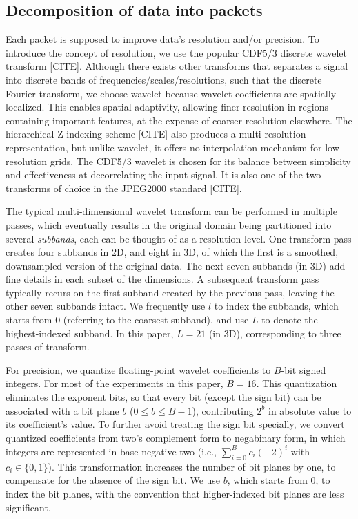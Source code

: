 \subsection{Decomposition of data into packets}\label{sec:data-streaming-framework}
Each packet is supposed to improve data's resolution and/or precision. To introduce the concept of
resolution, we use the popular CDF5/3 discrete wavelet transform [CITE]. Although there exists other
transforms that separates a signal into discrete bands of frequencies/scales/resolutions, such that
the discrete Fourier transform, we choose wavelet because wavelet coefficients are spatially
localized. This enables spatial adaptivity, allowing finer resolution in regions containing
important features, at the expense of coarser resolution elsewhere. The hierarchical-Z indexing
scheme [CITE] also produces a multi-resolution representation, but unlike wavelet, it offers no
interpolation mechanism for low-resolution grids. The CDF5/3 wavelet is chosen for its balance
between simplicity and effectiveness at decorrelating the input signal. It is also one of the two
transforms of choice in the JPEG2000 standard [CITE].

The typical multi-dimensional wavelet transform can be performed in multiple passes, which
eventually results in the original domain being partitioned into several \emph{subbands}, each can
be thought of as a resolution level. One transform pass creates four subbands in 2D, and eight in
3D, of which the first is a smoothed, downsampled version of the original data. The next seven
subbands (in 3D) add fine details in each subset of the dimensions. A subsequent transform pass
typically recurs on the first subband created by the previous pass, leaving the other seven subbands
intact. We frequently use $l$ to index the subbands, which starts from 0 (referring to the coarsest
subband), and use $L$ to denote the highest-indexed subband. In this paper, $L=21$ (in 3D),
corresponding to three passes of transform.

For precision, we quantize floating-point wavelet coefficients to $B$-bit signed integers. For most
of the experiments in this paper, $B=16$. This quantization eliminates the exponent bits, so that
every bit (except the sign bit) can be associated with a bit plane $b$ ($0\leq b\leq B-1$),
contributing $2^b$ in absolute value to its coefficient's value. To further avoid treating the sign
bit specially, we convert quantized coefficients from two's complement form to negabinary form, in
which integers are represented in base negative two (i.e., $\sum_{i=0}^{B}{c_i(-2)^i}$ with $c_i\in
\{0,1\}$). This transformation increases the number of bit planes by one, to compensate for the
absence of the sign bit. We use $b$, which starts from 0, to index the bit planes, with the
convention that higher-indexed bit planes are less significant.

